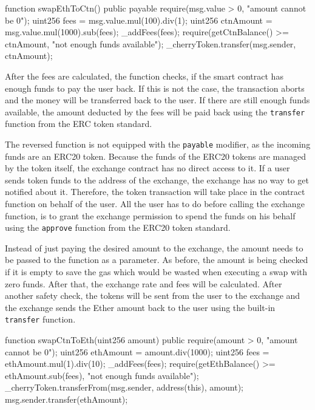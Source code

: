 \begin{GenericCode}
function swapEthToCtn() public payable {
  require(msg.value > 0, "amount cannot be 0");
  uint256 fees = msg.value.mul(100).div(1);
  uint256 ctnAmount = msg.value.mul(1000).sub(fees);
  _addFees(fees);
  require(getCtnBalance() >= ctnAmount, "not enough funds available");
  _cherryToken.transfer(msg.sender, ctnAmount);
  }	
\end{GenericCode}

After the fees are calculated, the function checks, if the smart contract has enough funds to pay the user back. If this is not the case, the transaction aborts and the money will be transferred back to the user. If there are still enough funds available, the amount deducted by the fees will be paid back using the \texttt{transfer} function from the ERC token standard.

The reversed function is not equipped with the \texttt{payable} modifier, as the incoming funds are an ERC20 token. Because the funds of the ERC20 tokens are managed by the token itself, the exchange contract has no direct access to it. If a user sends token funds to the address of the exchange, the exchange has no way to get notified about it. Therefore, the token transaction will take place in the contract function on behalf of the user. All the user has to do before calling the exchange function, is to grant the exchange permission to spend the funds on his behalf using the \texttt{approve} function from the ERC20 token standard.

Instead of just paying the desired amount to the exchange, the amount needs to be passed to the function as a parameter. As before, the amount is being checked if it is empty to save the gas which would be wasted when executing a swap with zero funds. After that, the exchange rate and fees will be calculated. After another safety check, the tokens will be sent from the user to the exchange and the exchange sends the Ether amount back to the user using the built-in \texttt{transfer} function.

\begin{GenericCode}
  function swapCtnToEth(uint256 amount) public {
    require(amount > 0, "amount cannot be 0");
    uint256 ethAmount = amount.div(1000);
    uint256 fees = ethAmount.mul(1).div(10);
    _addFees(fees);
    require(getEthBalance() >= ethAmount.sub(fees), "not enough funds available");
    _cherryToken.transferFrom(msg.sender, address(this), amount);
    msg.sender.transfer(ethAmount);
  }	
\end{GenericCode}

